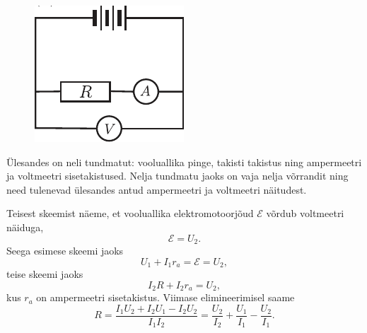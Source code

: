 {\begin{figure}[h]
\begin{minipage}[b]{0.3\textwidth}
		\includegraphics[width=\linewidth]{2005-v2g-04-yl2}
    \end{minipage}
\end{figure}

\fi


\ifHint
Ülesandes on neli tundmatut: vooluallika pinge, takisti takistus ning ampermeetri ja voltmeetri sisetakistused. Nelja tundmatu jaoks on vaja nelja võrrandit ning need tulenevad ülesandes antud ampermeetri ja voltmeetri näitudest.
\fi


\ifSolution
Teisest skeemist näeme, et vooluallika elektromotoorjõud $\mathcal E$ võrdub voltmeetri näiduga,
\[
\mathcal E = U_2.
\]
Seega esimese skeemi jaoks
\[
U_1 + I_1r_a = \mathcal E = U_2,
\]
teise skeemi jaoks
\[
I_2R + I_2r_a = U_2,
\]
kus $r_a$ on ampermeetri sisetakistus. Viimase elimineerimisel saame
\[
R=\frac{I_{1} U_{2}+I_{2} U_{1}-I_{2} U_{2}}{I_{1} I_{2}}=\frac{U_{2}}{I_{2}}+\frac{U_{1}}{I_{1}}-\frac{U_{2}}{I_{1}}.
\]
\fi
}
